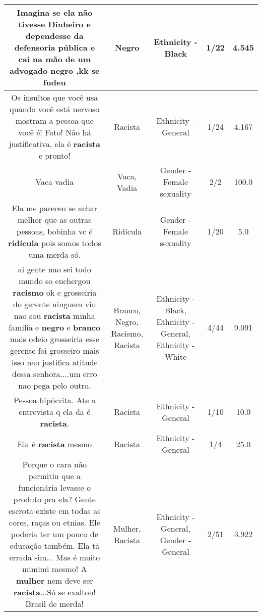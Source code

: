 \documentclass[11pt]{article}
\newlength\mylength
\begin{document}
\begin{center}
\begin{longtable}{|C{.65\mylength}|C{.30\mylength}|C{.12\mylength}|C{.12\mylength}|C{.12\mylength}|}
  \small Imagina se ela não tivesse Dinheiro e dependesse da defensoria pública e cai na mão de um advogado \textbf{negro} ,kk se fudeu\normalsize   & Negro & Ethnicity - Black & 1/22 & 4.545 \\  \hline
  \small Os insultos que você usa quando você está nervoso mostram a pessoa que você é! Fato! Não há justificativa, ela é \textbf{racista} e pronto!\normalsize   & Racista & Ethnicity - General & 1/24 & 4.167 \\  \hline
  \small Vaca vadia\normalsize   & Vaca, Vadia & Gender - Female sexuality & 2/2 & 100.0 \\  \hline
  \small Ela me pareceu se achar melhor que as outras pessoas, bobinha vc é \textbf{ridícula} pois somos todos uma merda só.\normalsize   & Ridícula & Gender - Female sexuality & 1/20 & 5.0 \\  \hline
  \small ai gente nao sei todo mundo so enchergou  \textbf{racismo} ok e grosseiria do gerente ninguem viu nao sou \textbf{racista} minha familia e \textbf{negro} e \textbf{branco} mais odeio grosseiria esse gerente foi grosseiro mais isso nao justifica atitude dessa senhora....um erro nao pega pelo outro.\normalsize   & Branco, Negro, Racismo, Racista & Ethnicity - Black, Ethnicity - General, Ethnicity - White & 4/44 & 9.091 \\  \hline
  \small Pessoa hipócrita. Ate a entrevista q ela da é \textbf{racista}.\normalsize   & Racista & Ethnicity - General & 1/10 & 10.0 \\  \hline
  \small Ela é \textbf{racista} mesmo\normalsize   & Racista & Ethnicity - General & 1/4 & 25.0 \\  \hline
  \small Porque o cara não permitiu que a funcionária levasse o produto pra ela? Gente escrota existe em todas as cores, raças ou etnias. Ele poderia ter um pouco de educação também. Ela tá errada sim... Mas é muito mimimi mesmo! A \textbf{mulher} nem deve ser \textbf{racista}...Só se exaltou! Brasil de merda!\normalsize   & Mulher, Racista & Ethnicity - General, Gender - General & 2/51 & 3.922 \\  \hline

\end{longtable}
\end{center}
\end{document}
